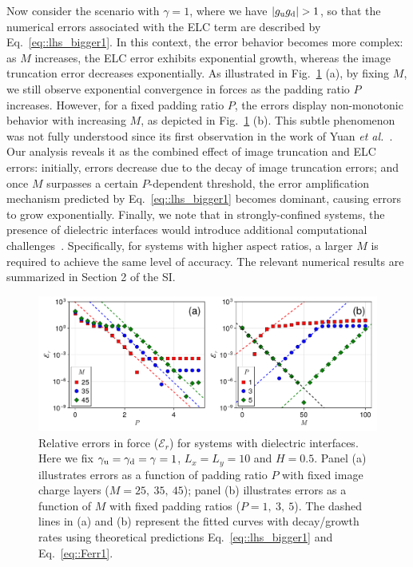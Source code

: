 Now consider the scenario with $\gamma = 1$, where we have $|g_{\text{u}}g_{\text{d}}| > 1$, so that the numerical errors associated with the ELC term are described by Eq.~\eqref{eq::lhs_bigger1}.
In this context, the error behavior becomes more complex: as $M$ increases, the ELC error exhibits exponential growth, whereas the image truncation error decreases exponentially.
As illustrated in Fig.~\ref{fig:error_icm_pad_gamma_1_force} (a), by fixing $M$, we still observe exponential convergence in forces as the padding ratio $P$ increases. 
However, for a fixed padding ratio $P$, the errors display non-monotonic behavior with increasing $M$, as depicted in Fig.~\ref{fig:error_icm_pad_gamma_1_force} (b).
This subtle phenomenon was not fully understood since its first observation in the work of Yuan \emph{et al.}~\cite{yuan2021particle}. 
Our analysis reveals it as the combined effect of image truncation and ELC errors: 
initially, errors decrease due to the decay of image truncation errors; and once $M$ surpasses a certain $P$-dependent threshold, the error amplification mechanism predicted by Eq.~\eqref{eq::lhs_bigger1} becomes dominant, causing errors to grow exponentially.
Finally, we note that in strongly-confined systems, the presence of dielectric interfaces would introduce additional computational challenges~\cite{dos2015electrolytes}. 
Specifically, for systems with higher aspect ratios, a larger $M$ is required to achieve the same level of accuracy. The relevant numerical results are summarized in Section 2 of the SI. 
\begin{figure}[htbp]
    \centering
    \includegraphics[width=0.98\linewidth]{figs/error_icm_pad_gamma_1_force.pdf}
    \caption{Relative errors in force ($\mathcal{E}_r$) for systems with dielectric interfaces. Here we fix $\gamma_{\text{u}}=\gamma_{\text{d}}=\gamma = 1$, $L_x=L_y=10$ and $H = 0.5$. 
    Panel (a) illustrates errors as a function of padding ratio $P$ with fixed image charge layers ($M=25,~35,~45$); panel (b) illustrates errors as a function of $M$ with fixed padding ratios ($P = 1,~3,~5$). The dashed lines in (a) and (b) represent the fitted curves with decay/growth rates using theoretical predictions Eq.~\eqref{eq::lhs_bigger1} and Eq.~\eqref{eq::Ferr1}.}
    \label{fig:error_icm_pad_gamma_1_force}
\end{figure}

